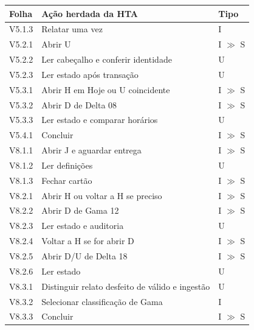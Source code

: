 \noindent\begin{minipage}[t]{\columnwidth}
\footnotesize
\begin{tabularx}{\columnwidth}{@{}lYP{.15\columnwidth}@{}}\toprule
Folha & Ação herdada da HTA & Tipo\\\midrule
V5.1.3 & Relatar uma vez & I\\
V5.2.1 & Abrir U & I $\gg$ S\\
V5.2.2 & Ler cabeçalho e conferir identidade & U\\
V5.2.3 & Ler estado após transação & U\\
V5.3.1 & Abrir H em Hoje ou U coincidente & I $\gg$ S\\
V5.3.2 & Abrir D de Delta 08 & I $\gg$ S\\
V5.3.3 & Ler estado e comparar horários & U\\
V5.4.1 & Concluir & I $\gg$ S\\
V8.1.1 & Abrir J e aguardar entrega & I $\gg$ S\\
V8.1.2 & Ler definições & U\\
V8.1.3 & Fechar cartão & I $\gg$ S\\
V8.2.1 & Abrir H ou voltar a H se preciso & I $\gg$ S\\
V8.2.2 & Abrir D de Gama 12 & I $\gg$ S\\
V8.2.3 & Ler estado e auditoria & U\\
V8.2.4 & Voltar a H se for abrir D & I $\gg$ S\\
V8.2.5 & Abrir D/U de Delta 18 & I $\gg$ S\\
V8.2.6 & Ler estado & U\\
V8.3.1 & Distinguir relato desfeito de válido e ingestão & U\\
V8.3.2 & Selecionar classificação de Gama & I\\
V8.3.3 & Concluir & I $\gg$ S\\
\bottomrule\end{tabularx}
\end{minipage}
\clearpage

